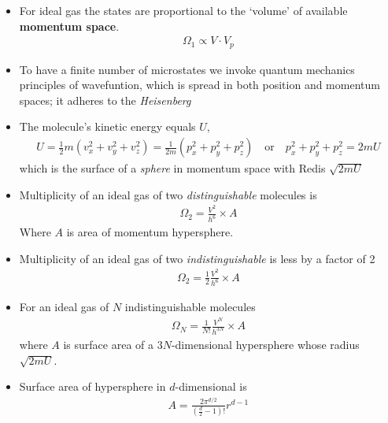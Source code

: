 \documentclass{book}
\begin{document}
\begin{itemize}

	\item For ideal gas the states are proportional to the `volume' of available \textbf{momentum space}.
	      \begin{align*}
		      \Omega_1 \propto V \cdot V_p
	      \end{align*}

	\item To have a finite number of microstates we invoke quantum mechanics principles of wavefuntion,
	      which is spread in both position and momentum spaces; it adheres to the \textit{Heisenberg}

	\item The molecule's kinetic energy equals $U$,
	      \begin{align}
		      U = \frac{1}{2} m (v_x^2 + v_y^2 + v_z^2) = \frac{1}{2m} (p_x^2  + p_y^2 + p_z^2)
		      \quad \text{or} \quad p_x^2  + p_y^2 + p_z^2 = 2m U
	      \end{align}
	      which is the surface of a \textit{sphere} in momentum space with Redis $\sqrt{2mU}$

	\item Multiplicity of an ideal gas of two \textit{distinguishable} molecules is
	      \begin{align}
		      \Omega_2 = \frac{V^2}{h^6} \times A
	      \end{align}
	      Where $A$ is area of momentum hypersphere.

	\item Multiplicity of an ideal gas of two \textit{indistinguishable} is less by
	      a factor of 2
	      \begin{align}
		      \Omega_2 = \frac{1}{2} \frac{V^2}{h^6} \times A
	      \end{align}


	\item For an ideal gas of $N$ indistinguishable molecules
	      \begin{align}
		      \Omega_N = \frac{1}{N!} \frac{V^N}{h^{3N}} \times A
	      \end{align}
	      where $A$ is surface area of a $3N$-dimensional hypersphere whose radius $\sqrt{2mU}$.

	\item Surface area of hypersphere in $d$-dimensional is
	      \begin{align}
		      A = \frac{2\pi^{d/2}}{(\frac{d}{2} - 1)!} r^{d-1}
	      \end{align}


\end{itemize}
\end{document}
